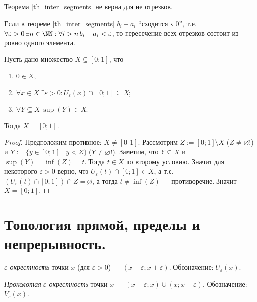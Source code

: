 \documentclass[12pt,a4paper]{article}
\begin{document}
    \begin{remark}
        Теорема \ref{th_inter_segments} не верна для не отрезков.
    \end{remark}

    \begin{remark}
        Если в теореме \ref{th_inter_segments} $b_i-a_i$ ``сходится к 0'', т.е. $\forall \varepsilon > 0\, \exists n\in\NN: \forall i > n\, b_i-a_i < \varepsilon$, то пересечение всех отрезков состоит из ровно одного элемента.
    \end{remark}

    \begin{theorem}
        Пусть дано множество $X \subseteq [0;1]$, что
        \begin{enumerate}
            \item $0 \in X$;
            \item $\forall x \in X\; \exists \varepsilon > 0: U_\varepsilon(x) \cap [0;1] \subseteq X$;
            \item $\forall Y \subseteq X\; \sup(Y) \in X$.
        \end{enumerate}
        Тогда $X = [0;1]$.
    \end{theorem}

    \begin{proof}
        Предположим противное: $X \neq [0;1]$. Рассмотрим $Z := [0;1] \setminus X$ ($Z \neq \varnothing$!) и $Y := \{y \in [0;1] \mid y < Z\}$ ($Y \neq \varnothing$!). Заметим, что $Y \subseteq X$ и $\sup(Y) = \inf(Z) = t$. Тогда $t \in X$ по второму условию. Значит для некоторого $\varepsilon > 0$ верно, что $U_{\varepsilon}(t) \cap [0;1] \in X$, а т.е. $(U_\varepsilon(t) \cap [0;1]) \cap Z = \varnothing$, а тогда $t \neq \inf(Z)$ --- противоречие. Значит $X = [0;1]$.
    \end{proof}

    \section{Топология прямой, пределы и непрерывность.}

    \begin{definition}
        \emph{$\varepsilon$-окрестность} точки $x$ (для $\varepsilon > 0$) --- $(x - \varepsilon; x+ \varepsilon)$. Обозначение: $U_\varepsilon(x)$.

        \emph{Проколотая $\varepsilon$-окрестность} точки $x$ --- $(x - \varepsilon; x) \cup (x; x + \varepsilon)$. Обозначение: $V_\varepsilon(x)$.
    \end{definition}
\end{document}
